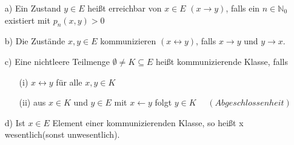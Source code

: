\mbox{}
\begin{itemize}
\item[a)] Ein Zustand $y \in E$ heißt erreichbar von $x \in E$ $(x \rightarrow y)$, falls ein $n \in \mathbb{N}_{0}$ existiert mit $p_{n}(x,y)>0$
\item[b)] Die Zustände $x,y \in E$ kommunizieren $(x\leftrightarrow y)$, falls $x \rightarrow y$ und $y \rightarrow x$. 
\item[c)] Eine nichtleere Teilmenge $\emptyset \neq K \subseteq E$ heißt kommunizierende Klasse, falls
\begin{itemize}
\item[(i)] $x \leftrightarrow y$ für alle $x,y \in K$
\item[(ii)] aus $x \in K$ und $y \in E$ mit $x \leftarrow y$ folgt $y \in K$ $\quad (Abgeschlossenheit)$
\end{itemize}
\item[d)] Ist $x \in E$ Element einer kommunizierenden Klasse, so heißt x wesentlich(sonst unwesentlich).
\end{itemize}